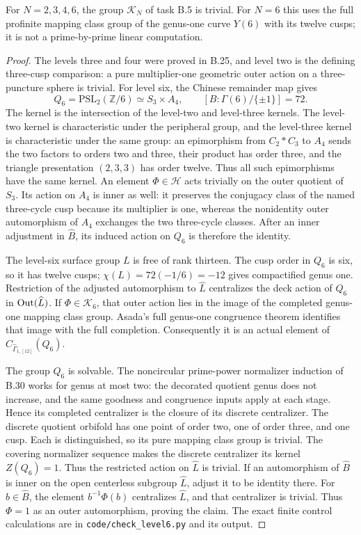 For $N=2,3,4,6$, the group $\mathcal K_N$ of task B.5 is trivial.
For $N=6$ this uses the full profinite mapping class group of the
genus-one curve $Y(6)$ with its twelve cusps; it is not a
prime-by-prime linear computation.
\begin{proof}
The levels three and four were proved in B.25, and level two
is the defining three-cusp comparison: a pure multiplier-one
geometric outer action on a three-puncture sphere is trivial.
For level six, the Chinese remainder map gives
\[
 Q_6=\mathrm{PSL}_2(\mathbb Z/6)
           \simeq S_3\times A_4,
 \qquad [B:\Gamma(6)/\{\pm1\}]=72.
\]
The kernel is the intersection of the level-two and level-three
kernels. The level-two kernel is characteristic under the
peripheral group, and the level-three kernel is characteristic
under the same group: an epimorphism from $C_2*C_3$ to $A_4$
sends the two factors to orders two and three, their product
has order three, and the triangle presentation $(2,3,3)$
has order twelve. Thus all such epimorphisms have the same kernel.
An element $\Phi\in\mathcal H$ acts trivially on the outer
quotient of $S_3$. Its action on $A_4$ is inner as well:
it preserves the conjugacy class of the named three-cycle
cusp because its multiplier is one, whereas the nonidentity
outer automorphism of $A_4$ exchanges the two three-cycle
classes. After an inner adjustment in $\widehat B$, its
induced action on $Q_6$ is therefore the identity.

The level-six surface group $L$ is free of rank thirteen.
The cusp order in $Q_6$ is six, so it has twelve cusps;
$\chi(L)=72(-1/6)=-12$ gives compactified genus one.
Restriction of the adjusted automorphism to $\widehat L$
centralizes the deck action of $Q_6$ in $\operatorname{Out}(\widehat L)$.
If $\Phi\in\mathcal K_6$, that outer action lies in the
image of the completed genus-one mapping class group.
Asada's full genus-one congruence theorem\citep[Theorem 3A]{Asada2001} identifies that
image with the full completion. Consequently it is an
actual element of $C_{\widehat\Gamma_{1,[12]}}(Q_6)$.

The group $Q_6$ is solvable. The noncircular prime-power
normalizer induction of B.30 works for genus at most two:
the decorated quotient genus does not increase, and the
same goodness and congruence inputs apply at each stage.
Hence its completed centralizer is the closure of its
discrete centralizer. The discrete quotient orbifold has
one point of order two, one of order three, and one cusp.
Each is distinguished, so its pure mapping class group
is trivial. The covering normalizer sequence makes the
discrete centralizer its kernel $Z(Q_6)=1$.
Thus the restricted action on $\widehat L$ is trivial.
If an automorphism of $\widehat B$ is inner on the open
centerless subgroup $\widehat L$, adjust it to be identity
there. For $b\in\widehat B$, the element $b^{-1}\Phi(b)$
centralizes $\widehat L$, and that centralizer is trivial.
Thus $\Phi=1$ as an outer automorphism, proving the claim.
The exact finite control calculations are in
\texttt{code/check\_level6.py} and its output.
\end{proof}

